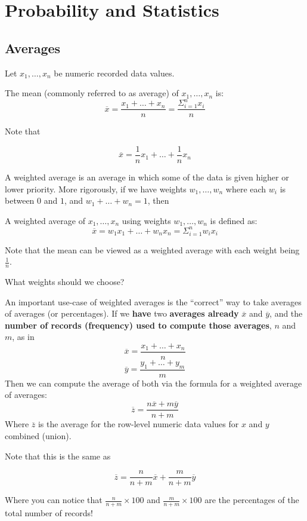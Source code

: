 \section{Probability and Statistics}

\subsection{Averages}
Let $x_1,\dots, x_n$ be numeric recorded data values.

\begin{definition} The mean (commonly referred to as average) of $x_1,\dots, x_n$ is:
\[\overline{x} = \frac{x_1 + \dots + x_n}{n}= \frac{\Sigma_{i=1}^nx_i}{n}\]
\end{definition}

Note that 

\[\overline{x}= \frac{1}{n}x_1 + \dots + \frac{1}{n}x_n\]

A weighted average is an average in which some of the data is given higher or lower priority. More rigorously, if we have weights $w_1, \dots, w_n$ where each $w_i$ is between $0$ and $1$, and $w_1 + \dots + w_n = 1$, then

\begin{definition} A weighted average of $x_1, \dots, x_n$ using weights $w_1, \dots, w_n$ is defined as:
\[\overline{x} = w_1x_1 + \dots + w_nx_n= \Sigma_{i=1}^nw_ix_i\]
\end{definition}
Note that the mean can be viewed as a weighted average with each weight being $\frac{1}{n}$. 

What weights should we choose? 

An important use-case of weighted averages is the ``correct'' way to take averages of averages (or percentages). If we \textbf{have} two \textbf{averages already} $\overline{x}$ and $\overline{y}$, and the \textbf{number of records (frequency) used to compute those averages}, $n$ and $m$, as in
\[\overline{x} =  \frac{x_1 + \dots + x_n}{n}\]
\[\overline{y} =  \frac{y_1 + \dots + y_m}{m}\]
Then we can compute the average of both via the formula for a weighted average of averages:
    \[ \overline{z} = \frac{n\overline{x}+m\overline{y}}{n+m}\]
Where $\overline{z}$ is the average for the row-level numeric data values for $x$ and $y$ combined (union).

Note that this is the same as

\[\overline{z}= \frac{n}{n+m}\overline{x}+ \frac{m}{n+m}\overline{y}\]

Where you can notice that $\frac{n}{n+m}\times100$ and $\frac{m}{n+m}\times100$ are the percentages of the total number of records!

